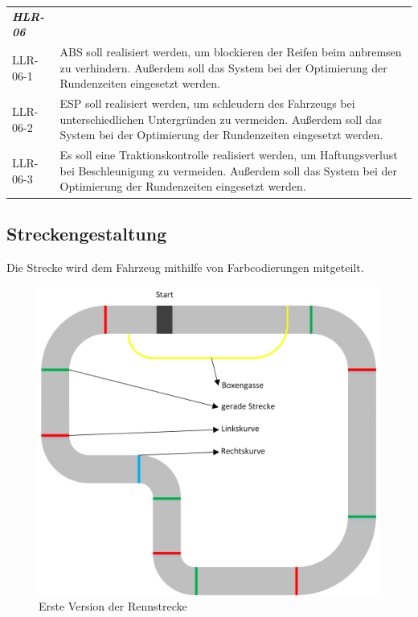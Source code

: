 \documentclass[a4paper,12pt]{article}                                         %
\numberwithin{table}{section}                               %
\numberwithin{figure}{section}                              %
\begin{document}
	\begin{tabular}{ l | p{} }
	\textbf{\textit{HLR-06}} & \\
	LLR-06-1 &
	ABS soll realisiert werden, um blockieren der Reifen beim anbremsen zu verhindern. Außerdem soll das System bei der Optimierung der Rundenzeiten eingesetzt werden.\\
	LLR-06-2 &
	ESP soll realisiert werden, um schleudern des Fahrzeugs bei unterschiedlichen Untergründen zu vermeiden. Außerdem soll das System bei der Optimierung der Rundenzeiten eingesetzt werden.\\
	LLR-06-3 &
	Es soll eine Traktionskontrolle realisiert werden, um Haftungsverlust bei Beschleunigung zu vermeiden. Außerdem soll das System bei der Optimierung der Rundenzeiten eingesetzt werden.\\	
	\end{tabular}
	
	\newpage
	\subsection{Streckengestaltung}\label{strecke}
	Die Strecke wird dem Fahrzeug mithilfe von Farbcodierungen mitgeteilt.
	
	\begin{figure}[h]
	\begin{center}
				\includegraphics{../Bilder/Rennstrecke}
				\end{center}
				\caption{Erste Version der Rennstrecke} 
			\end{figure}
			
\end{document}
